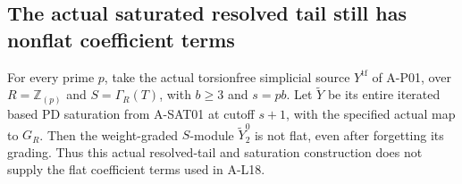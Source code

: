 \subsection{The actual saturated resolved tail still has nonflat coefficient terms}

\begin{proposition}
\label{AL19}
For every prime $p$, take the actual torsionfree
simplicial source $Y^{\mathrm{tf}}$ of A-P01, over
$R=\mathbb Z_{(p)}$ and $S=\Gamma_R(T)$, with
$b\geq3$ and $s=pb$. Let $\widetilde Y$ be its
entire iterated based PD saturation from A-SAT01
at cutoff $s+1$, with the specified actual map to
$G_R$. Then the weight-graded $S$-module
$\widetilde Y_2^0$ is not flat, even after forgetting
its grading. Thus this actual resolved-tail and
saturation construction does not supply the flat
coefficient terms used in A-L18.
\end{proposition}

